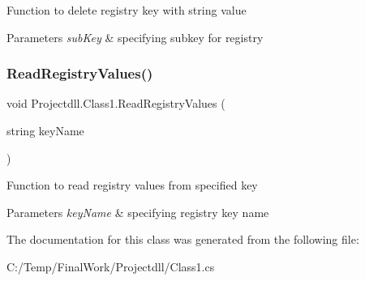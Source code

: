 Function to delete registry key with string value 
\begin{DoxyParams}{Parameters}
{\em sub\+Key} & specifying subkey for registry \\
\hline
\end{DoxyParams}
\mbox{\label{class_projectdll_1_1_class1_a7f3c2167cf4ca17f248b95f364e42294}} 
\subsubsection{\texorpdfstring{Read\+Registry\+Values()}{ReadRegistryValues()}}
{\footnotesize\ttfamily void Projectdll.\+Class1.\+Read\+Registry\+Values (\begin{DoxyParamCaption}\item[{string}]{key\+Name }\end{DoxyParamCaption})}

Function to read registry values from specified key 
\begin{DoxyParams}{Parameters}
{\em key\+Name} & specifying registry key name \\
\hline
\end{DoxyParams}


The documentation for this class was generated from the following file\+:\begin{DoxyCompactItemize}
\item 
C\+:/\+Temp/\+Final\+Work/\+Projectdll/Class1.\+cs\end{DoxyCompactItemize}

